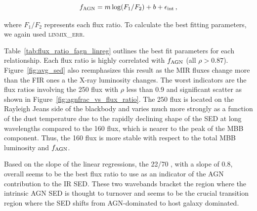 \documentclass[fleqn, usenatbib]{mnras}
\begin{document}
\begin{equation}
f_{\rm AGN} = m\log(F_{1}/F_{2}) + b + \epsilon_{\rm int}\,,
\end{equation}

\noindent where $F_{1}/F_{2}$ represents each flux ratio. To calculate the best fitting parameters, we again used \textsc{linmix\_err}. 

Table~\ref{tab:flux_ratio_fagn_linreg} outlines the best fit parameters for each relationship. Each flux ratio is highly correlated with $f_{\rm AGN}$ (all $\rho > 0.87$). {\color{red}Figure~\ref{fig:avg_sed} also reemphasizes this result as the MIR fluxes change more than the FIR ones a the X-ray luminosity changes.} The worst indicators are the flux ratios involving the 250 \micron{} flux with $\rho$ less than 0.9 and significant scatter as shown in Figure~\ref{fig:agnfrac_vs_flux_ratio}. The 250 \micron{} flux is located on the Rayleigh Jeans side of the blackbody and varies much more strongly as a function of the dust temperature due to the rapidly declining shape of the SED at long wavelengths compared to the 160 \micron{} flux, which is nearer to the peak of the MBB component. Thus, the 160 \micron{} flux is more stable with respect to the total MBB luminosity and $f_{\rm AGN}$.

Based on the slope of the linear regressions, the 22/70 \micron{}, with a slope of 0.8, overall seems to be the best flux ratio to use as an indicator of the AGN contribution to the IR SED. These two wavebands bracket the region where the intrinsic AGN SED is thought to turnover \citep[e.g.][]{Netzer:2007ve, Mullaney:2011yq} and seems to be the crucial transition region where the SED shifts from AGN-dominated to host galaxy dominated.  

\end{document}

